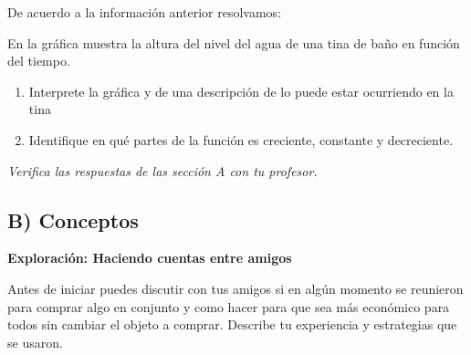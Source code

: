 \documentclass[12pt,a4paper]{article}
\begin{document}
\vspace{3mm}

\begin{tcolorbox}[colback=fondoverde,colframe=verdeclaro,title=\textbf{PRACTICA}]

De acuerdo a la información anterior resolvamos:

En la gráfica muestra la altura del nivel del agua de una tina de baño en función del tiempo.

\begin{center}
\end{center}

\begin{enumerate}
\item Interprete la gráfica y de una descripción de lo puede estar ocurriendo en la tina
\item Identifique en qué partes de la función es creciente, constante y decreciente.
\end{enumerate}

\textit{Verifica las respuestas de las sección A con tu profesor.}

\end{tcolorbox}

\vspace{5mm}


\subsection*{B) Conceptos}

\textbf{Exploración: Haciendo cuentas entre amigos}

Antes de iniciar puedes discutir con tus amigos si en algún momento se reunieron para comprar algo en conjunto y como hacer para que sea más económico para todos sin cambiar el objeto a comprar. Describe tu experiencia y estrategias que se usaron.
\end{document}
